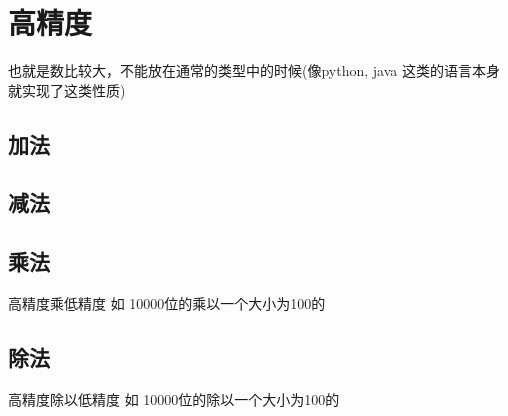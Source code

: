 \section{高精度}
也就是数比较大，不能放在通常的类型中的时候(像python, java 这类的语言本身就实现了这类性质)
\subsection{加法}

\subsection{减法}

\subsection{乘法}
高精度乘低精度 如 10000位的乘以一个大小为100的

\subsection{除法}
高精度除以低精度 如 10000位的除以一个大小为100的
